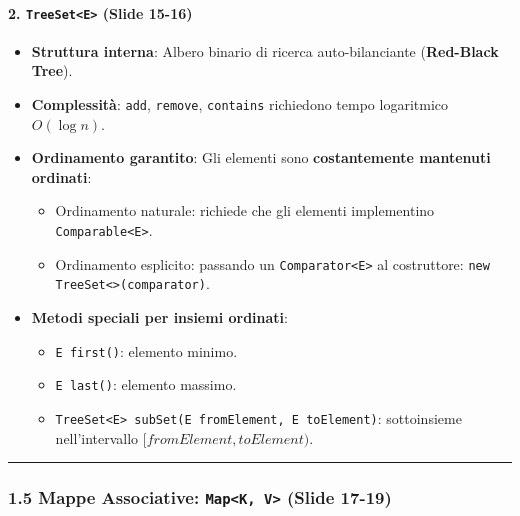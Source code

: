 \documentclass[11pt,a4paper]{article}
\newcommand{\passthrough}[1]{#1}
\providecommand{\tightlist}{\setlength{\itemsep}{0pt}\setlength{\parskip}{0pt}}
\begin{document}
\paragraph{\texorpdfstring{2. \texttt{TreeSet\textless{}E\textgreater{}}
(Slide
15-16)}{2. TreeSet\textless E\textgreater{} (Slide 15-16)}}\label{treesete-slide-15-16}

\begin{itemize}
\tightlist
\item
  \textbf{Struttura interna}: Albero binario di ricerca auto-bilanciante
  (\textbf{Red-Black Tree}).
\item
  \textbf{Complessità}: \passthrough{\lstinline!add!},
  \passthrough{\lstinline!remove!}, \passthrough{\lstinline!contains!}
  richiedono tempo logaritmico \textbf{\(O(\log n)\)}.
\item
  \textbf{Ordinamento garantito}: Gli elementi sono
  \textbf{costantemente mantenuti ordinati}:

  \begin{itemize}
  \tightlist
  \item
    Ordinamento naturale: richiede che gli elementi implementino
    \passthrough{\lstinline!Comparable<E>!}.
  \item
    Ordinamento esplicito: passando un
    \passthrough{\lstinline!Comparator<E>!} al costruttore:
    \passthrough{\lstinline!new TreeSet<>(comparator)!}.
  \end{itemize}
\item
  \textbf{Metodi speciali per insiemi ordinati}:

  \begin{itemize}
  \tightlist
  \item
    \passthrough{\lstinline!E first()!}: elemento minimo.
  \item
    \passthrough{\lstinline!E last()!}: elemento massimo.
  \item
    \passthrough{\lstinline!TreeSet<E> subSet(E fromElement, E toElement)!}:
    sottoinsieme nell'intervallo \([fromElement, toElement)\).
  \end{itemize}
\end{itemize}

\begin{center}\rule{0.5\linewidth}{0.5pt}\end{center}

\subsubsection{\texorpdfstring{1.5 Mappe Associative:
\texttt{Map\textless{}K,\ V\textgreater{}} (Slide
17-19)}{1.5 Mappe Associative: Map\textless K, V\textgreater{} (Slide 17-19)}}\label{mappe-associative-mapk-v-slide-17-19}
\end{document}
